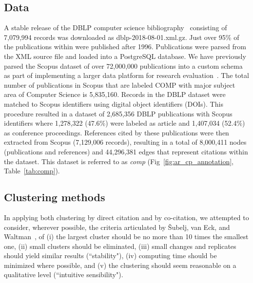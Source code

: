 \subsection{Data}
 A stable release of the DBLP computer science bibliography~\cite{dblp_ref} consisting of 7,079,994 records was downloaded as dblp-2018-08-01.xml.gz. Just over 95\% of the publications within were published after 1996. Publications were parsed from the XML source file and loaded into a PostgreSQL database.  We have previously parsed the Scopus dataset of over 72,000,000 publications into a custom schema as part of implementing a larger data platform for research evaluation~\cite{GithubERNIE2019}. The total number of publications in Scopus that are labeled COMP with major subject area of Computer Science is 5,835,160. Records in the DBLP dataset were matched to Scopus identifiers using digital object identifiers (DOIs). 
 This procedure resulted in a dataset of 2,685,356 DBLP publications with Scopus identifiers where 1,278,322 (47.6\%) were labeled as article and 1,407,034 (52.4\%) as conference proceedings.  
 References cited by these publications were then extracted from Scopus (7,129,006 records), resulting in a total of 8,000,411 nodes (publications and references) and 44,296,381 edges that represent citations within the dataset. 
 This dataset is referred to as \emph{comp} (Fig~\ref{fig:ar_cp_annotation}, Table~\ref{tab:comp}).  
 
 
\subsection{Clustering methods} In applying both clustering by direct citation and by co-citation, we attempted to consider, wherever possible, the criteria articulated by \v{S}ubelj, van Eck, and Waltman~\cite{subelj_clustering_2016}, of (i) the largest cluster should be no more than 10 times the smallest one, (ii) small clusters should be eliminated, (iii) small changes and replicates should yield similar results (``stability"),  (iv) computing time should be minimized where possible, and (v) the clustering should seem reasonable on a qualitative level (``intuitive sensibility").

